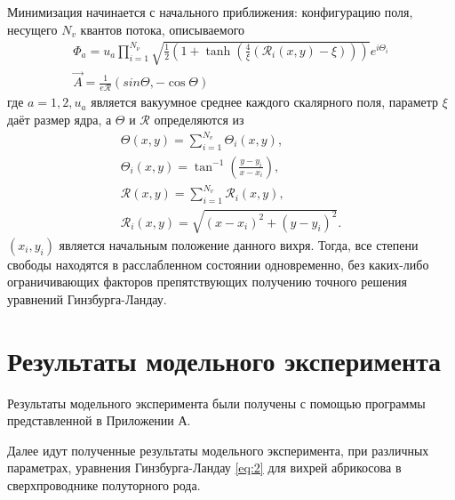 Минимизация начинается с начального приближения: конфигурацию поля, несущего
\( N_v \) квантов потока, описываемого
\begin{gather}
    \Phi_a = u_a \prod\limits_{i=1}^{N_\nu} \sqrt{ 
        \frac{1}{2}\left( 1 + \tanh\left( 
            \frac{4}{\xi}\left( \mathcal{R}_i(x,y) - \xi \right)
        \right) \right)
    } e^{i\Theta_i}
    \nonumber \\
    \vec{A} = \frac{1}{e\mathcal{R}}\left( sin\Theta, -\cos\Theta \right)
    \label{eqm:6}
\end{gather}
где \( a = 1,2, u_a \) является вакуумное среднее каждого скалярного поля, 
параметр \( \xi \) даёт размер ядра, а \( \Theta \) и
\( \mathcal{R} \) определяются из
\begin{gather}
    \Theta(x,y) = \sum\limits_{i=1}^{N_v} \Theta_i(x,y), \nonumber \\
    \Theta_i(x,y) = \tan^{-1}\left(\frac{y-y_i}{x-x_i} \right), \nonumber \\
    \mathcal{R}(x,y) = \sum\limits_{i=1}^{N_v} \mathcal{R}_i(x,y), \nonumber \\
    \mathcal{R}_i(x,y) = \sqrt{(x-x_i)^2+(y-y_i)^2}.
\end{gather}
\( (x_i,y_i) \) является начальным положение данного вихря. Тогда, все степени 
свободы находятся в расслабленном состоянии одновременно, без каких-либо 
ограничивающих факторов препятствующих получению точного решения уравнений 
Гинзбурга-Ландау.
\cite{bib:minimization}

\newpage

\section{Результаты модельного эксперимента}

Результаты модельного эксперимента были получены с помощью программы 
представленной в Приложении А. 

Далее идут полученные результаты модельного эксперимента, при различных 
параметрах, уравнения Гинзбурга-Ландау \eqref{eq:2} для вихрей абрикосова в 
сверхпроводнике полуторного рода.


